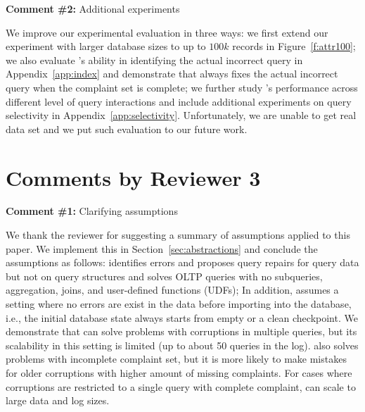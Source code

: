 \comskip

\noindent
\textbf{Comment \#2:} Additional experiments
\begin{quote}
\end{quote}

We improve our experimental evaluation in three ways: we first extend our
experiment with larger database sizes to up to $100k$ records in
Figure~\ref{f:attr100}; we also evaluate \sys's ability in identifying the
actual incorrect query in Appendix~\ref{app:index} and demonstrate that \sys
always fixes the actual incorrect query when the complaint set is complete; we
further study \sys's performance across different level of query interactions
and include additional experiments on query selectivity in
Appendix~\ref{app:selectivity}. Unfortunately, we are unable to get real data
set and we put such evaluation to our future work.



\section*{Comments by Reviewer 3}

\noindent
\textbf{Comment \#1:} Clarifying assumptions
\begin{quote}
\end{quote}

We thank the reviewer for suggesting a summary of assumptions applied to this paper. We implement this in Section~\ref{sec:abstractions} and 
conclude the assumptions as follows:  \sys identifies errors and proposes query repairs 
for query data but not on query structures and solves 
OLTP queries with no subqueries, aggregation, joins, and user-defined functions (UDFs); 
In addition, \sys assumes a setting where no errors are exist in the data before importing into the database, i.e., 
the initial database state always starts from empty or a clean checkpoint. 
We demonstrate that \sys can solve problems with corruptions in multiple queries, but its scalability in 
this setting is limited (up to about 50 queries in the log).  \sys also solves problems with incomplete
complaint set, but it is more likely to make mistakes for older corruptions with higher amount of missing complaints. 
For cases where corruptions are restricted to a single query with complete complaint, 
\sys can scale to large data and log sizes.

